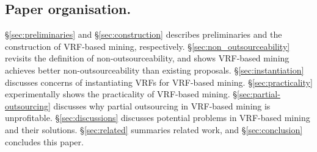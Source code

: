 \subsection{Paper organisation.}
\S\ref{sec:preliminaries} and \S\ref{sec:construction} describes preliminaries and the construction of VRF-based mining, respectively.
\S\ref{sec:non_outsourceability} revisits the definition of non-outsourceability, and shows VRF-based mining achieves better non-outsourceability than existing proposals.
\S\ref{sec:instantiation} discusses concerns of instantiating VRFs for VRF-based mining.
\S\ref{sec:practicality} experimentally shows the practicality of VRF-based mining.
\S\ref{sec:partial-outsourcing} discusses why partial outsourcing in VRF-based mining is unprofitable.
\S\ref{sec:discussions} discusses potential problems in VRF-based mining and their solutions.
\S\ref{sec:related} summaries related work, and \S\ref{sec:conclusion} concludes this paper.
